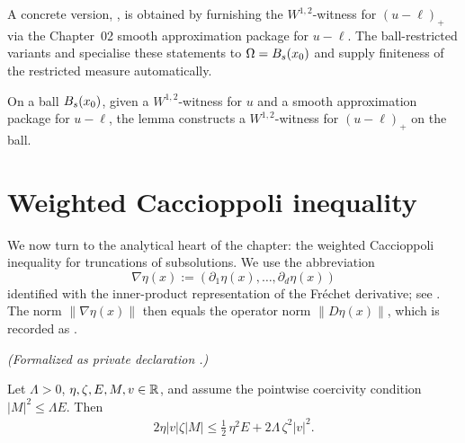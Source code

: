 A concrete version, ,
is obtained by furnishing the $W^{1,2}$-witness for $(u-\ell)_+$ via the
Chapter~02 smooth approximation package for $u-\ell$.  The
ball-restricted variants
 and
specialise these statements to $\Omega = B_{s}(x_0)$ and supply
finiteness of the restricted measure automatically.

\begin{definition}
\label{def:positivePartSub_memW1pWitness_on_ball}
\leanok
{}
On a ball $B_{s}(x_0)$, given a $W^{1,2}$-witness for $u$ and a
smooth approximation package for $u - \ell$, the lemma constructs a
$W^{1,2}$-witness for $(u - \ell)_+$ on the ball.
\end{definition}

\section{Weighted Caccioppoli inequality}

We now turn to the analytical heart of the chapter: the weighted
Caccioppoli inequality for truncations of subsolutions.  We use the
abbreviation
\begin{equation*}
  \nabla \eta(x) := (\partial_1 \eta(x), \dots, \partial_d \eta(x))
\end{equation*}
identified with the inner-product representation of the Fréchet
derivative; see .  The norm
$\|\nabla \eta(x)\|$ then equals the operator norm
$\|D\eta(x)\|$, which is recorded as
.

\begin{lemma}
\label{lem:weighted_caccioppoli_pointwise}
\leanok
\noindent\textit{(Formalized as private declaration .)}\par
Let $\Lambda > 0$, $\eta, \zeta, E, M, v \in \mathbb{R}$, and assume the
pointwise coercivity condition $|M|^2 \le \Lambda E$. Then
\begin{align*}
  2 \eta |v| \zeta |M|
   \le \tfrac{1}{2}\, \eta^2 E + 2\Lambda\, \zeta^2 |v|^2.
\end{align*}
\end{lemma}

